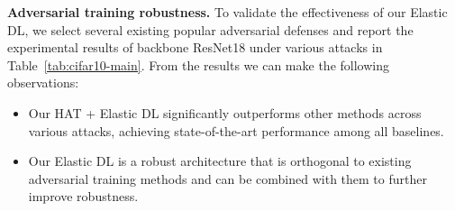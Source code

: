 \textbf{Adversarial training robustness.} To validate the effectiveness of our Elastic DL, we select several existing popular adversarial defenses and report the experimental
results of backbone ResNet18 under various attacks in Table~\ref{tab:cifar10-main}.  From the results we can make the following observations:
\vspace{-0.1in}
\begin{itemize}[left=0em]
    \item Our HAT + Elastic DL significantly outperforms other methods across various attacks, achieving state-of-the-art performance among all baselines.
    \item Our Elastic DL is a robust architecture that is orthogonal to existing adversarial training methods and can be combined with them to further improve robustness.
\end{itemize}







